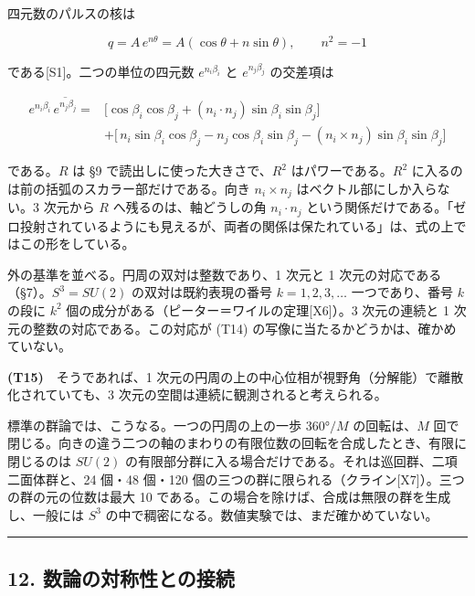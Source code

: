 \documentclass[
  a4paper,
]{ltjsarticle}
\begin{document}
四元数のパルスの核は

\[
q=A\,e^{n\theta}=A(\cos\theta+n\sin\theta),\qquad n^{2}=-1
\]

である{[}S1{]}。二つの単位の四元数 \(e^{n_i\beta_i}\) と
\(e^{n_j\beta_j}\) の交差項は

\[
\begin{aligned}
e^{n_i\beta_i}\,\overline{e^{n_j\beta_j}}={}&\bigl[\cos\beta_i\cos\beta_j+(n_i\cdot n_j)\sin\beta_i\sin\beta_j\bigr]\\
&+\bigl[\,n_i\sin\beta_i\cos\beta_j-n_j\cos\beta_i\sin\beta_j-(n_i\times n_j)\sin\beta_i\sin\beta_j\bigr]
\end{aligned}
\]

である。\(R\) は §9 で読出しに使った大きさで、\(R^2\)
はパワーである。\(R^2\) に入るのは前の括弧のスカラー部だけである。向き
\(n_i\times n_j\) はベクトル部にしか入らない。3 次元から \(R\)
へ残るのは、軸どうしの角 \(n_i\cdot n_j\)
という関係だけである。「ゼロ投射されているようにも見えるが、両者の関係は保たれている」は、式の上ではこの形をしている。

外の基準を並べる。円周の双対は整数であり、1 次元と 1
次元の対応である（§7）。\(S^3=SU(2)\) の双対は既約表現の番号
\(k=1,2,3,\ldots\) 一つであり、番号 \(k\) の段に \(k^2\)
個の成分がある（ピーター＝ワイルの定理{[}X6{]}）。3 次元の連続と 1
次元の整数の対応である。この対応が (T14)
の写像に当たるかどうかは、確かめていない。

\textbf{(T15)}　そうであれば、1
次元の円周の上の中心位相が視野角（分解能）で離散化されていても、3
次元の空間は連続に観測されると考えられる。

標準の群論では、こうなる。一つの円周の上の一歩 \(360°/M\)
の回転は、\(M\)
回で閉じる。向きの違う二つの軸のまわりの有限位数の回転を合成したとき、有限に閉じるのは
\(SU(2)\)
の有限部分群に入る場合だけである。それは巡回群、二項二面体群と、24
個・48 個・120
個の三つの群に限られる（クライン{[}X7{]}）。三つの群の元の位数は最大 10
である。この場合を除けば、合成は無限の群を生成し、一般には \(S^3\)
の中で稠密になる。数値実験では、まだ確かめていない。

\begin{center}\rule{0.5\linewidth}{0.5pt}\end{center}

\subsection{12.
数論の対称性との接続}\label{ux6570ux8ad6ux306eux5bfeux79f0ux6027ux3068ux306eux63a5ux7d9a}
\end{document}
